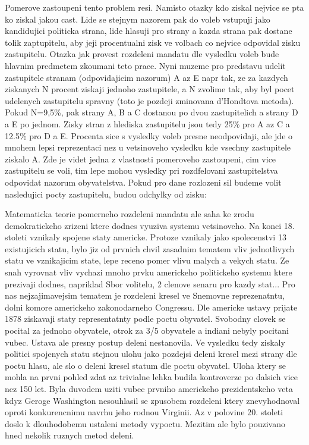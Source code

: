 \documentclass[12pt,a4paper]{article}
\begin{document}
Pomerove zastoupeni tento problem resi. Namisto otazky kdo ziskal nejvice se pta ko ziskal jakou cast. Lide se stejnym nazorem pak do voleb vstupuji jako kandidujici politicka strana, lide hlasuji pro strany a kazda strana pak dostane tolik zaptupitelu, aby jeji procentualni zisk ve volbach co nejvice odpovidal zisku zastupitelu. Otazka jak provest rozdeleni mandatu dle vysledku voleb bude hlavnim predmetem zkoumani teto prace. Nyni muzeme pro predstavu udelit zastupitele stranam (odpovidajicim nazorum) A az E napr tak, ze za kazdych ziskanych N procent ziskaji jednoho zastupitele, a N zvolime tak, aby byl pocet udelenych zastupitelu spravny (toto je pozdeji zminovana d'Hondtova metoda). Pokud N=9,5\%, pak strany A, B a C dostanou po dvou zastupitelich a strany D a E po jednom. Zisky stran z hlediska zastupitelu jsou tedy 25\% pro A az C a 12.5\% pro D a E. Procenta sice s vysledky voleb presne neodpovidaji, ale jde o mnohem lepsi reprezentaci nez u vetsinoveho vysledku kde vsechny zastupitele ziskalo A. Zde je videt jedna z vlastnosti pomeroveho zastoupeni, cim vice zastupitelu se voli, tim lepe mohou vysledky pri rozdfelovani zastupitelstva odpovidat nazorum obyvatelstva. Pokud pro dane rozlozeni sil budeme volit nasledujici pocty zastupitelu, budou odchylky od  zisku:

Matematicka teorie pomerneho rozdeleni mandatu ale saha ke zrodu demokratickeho zrizeni ktere dodnes vyuziva systemu vetsinoveho. Na konci 18. stoleti vznikaly spojene staty americke. Protoze vznikaly jako spolecenstvi 13 existujicich statu, bylo jiz od prvnich chvil zasadnim tematem vliv jednotlivych statu ve vznikajicim state, lepe receno pomer vlivu malych a vekych statu. Ze snah vyrovnat vliv vychazi mnoho prvku americkeho politickeho systemu ktere prezivaji dodnes, napriklad Sbor volitelu, 2 clenove senaru pro kazdy stat... 
Pro nas nejzajimavejsim tematem je rozdeleni kresel ve Snemovne reprezenatntu, dolni komore americkeho zakonodarneho Congressu. Dle americke ustavy prijate 1878 ziskavaji staty representatnty podle poctu obyvatel. Svobodny clovek se pocital za jednoho obyvatele, otrok za 3/5 obyvatele a indiani nebyly pocitani vubec. Ustava ale presny postup deleni nestanovila. Ve vysledku tedy ziskaly politici spojenych statu stejnou ulohu jako pozdejsi deleni kresel mezi strany dle poctu hlasu, ale slo o deleni kresel statum dle poctu obyvatel. 
Uloha ktery se mohla na prvni pohled zdat az trivialne lehka budila kontroverze po dalsich vice nez 150 let. Byla duvodem uziti vubec prvniho americkeho prezidentskeho veta kdyz Geroge Washington nesouhlasil se zpusobem rozdeleni ktery znevyhodnoval oproti konkurencnimu navrhu jeho rodnou Virginii. Az v polovine 20. stoleti doslo k dlouhodobemu ustaleni metody vypoctu. Mezitim ale bylo pouzivano hned nekolik ruznych metod deleni. %
\end{document}
